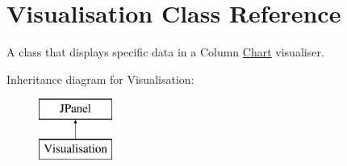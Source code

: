 \hypertarget{class_visualisation}{\section{Visualisation Class Reference}
\label{class_visualisation}
}


A class that displays specific data in a Column \hyperlink{interface_chart}{Chart} visualiser.  


Inheritance diagram for Visualisation\-:\begin{figure}[H]
\begin{center}
\leavevmode
\includegraphics[height=2.000000cm]{class_visualisation}
\end{center}
\end{figure}

